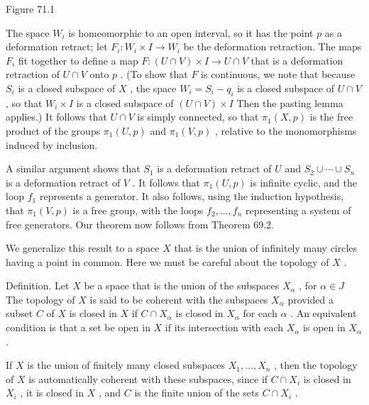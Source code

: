 \documentclass[10pt]{article}
\begin{document}
Figure 71.1

The space \({W}_{i}\) is homeomorphic to an open interval, so it has the point \(p\) as a deformation retract; let \({F}_{i} : {W}_{i} \times  I \rightarrow  {W}_{i}\) be the deformation retraction. The maps \({F}_{i}\) fit together to define a map \(F : \left( {U \cap  V}\right)  \times  I \rightarrow  U \cap  V\) that is a deformation retraction of \(U \cap  V\) onto \(p\) . (To show that \(F\) is continuous, we note that because \({S}_{i}\) is a closed subspace of \(X\) , the space \({W}_{i} = {S}_{i} - {q}_{i}\) is a closed subspace of \(U \cap  V\) , so that \({W}_{i} \times  I\) is a closed subspace of \(\left( {U \cap  V}\right)  \times  I\) Then the pasting lemma applies.) It follows that \(U \cap  V\) is simply connected, so that \({\pi }_{1}\left( {X,p}\right)\) is the free product of the groups \({\pi }_{1}\left( {U,p}\right)\) and \({\pi }_{1}\left( {V,p}\right)\) , relative to the monomorphisms induced by inclusion.

A similar argument shows that \({S}_{1}\) is a deformation retract of \(U\) and \({S}_{2} \cup  \cdots  \cup  {S}_{n}\) is a deformation retract of \(V\) . It follows that \({\pi }_{1}\left( {U,p}\right)\) is infinite cyclic, and the loop \({f}_{1}\) represents a generator. It also follows, using the induction hypothesis, that \({\pi }_{1}\left( {V,p}\right)\) is a free group, with the loops \({f}_{2},\ldots ,{f}_{n}\) representing a system of free generators. Our theorem now follows from Theorem 69.2.

We generalize this result to a space \(X\) that is the union of infinitely many circles having a point in common. Here we must be careful about the topology of \(X\) .

Definition. Let \(X\) be a space that is the union of the subspaces \({X}_{\alpha }\) , for \(\alpha  \in  J\) The topology of \(X\) is said to be coherent with the subspaces \({X}_{\alpha }\) provided a subset \(C\) of \(X\) is closed in \(X\) if \(C \cap  {X}_{\alpha }\) is closed in \({X}_{\alpha }\) for each \(\alpha\) . An equivalent condition is that a set be open in \(X\) if its intersection with each \({X}_{\alpha }\) is open in \({X}_{\alpha }\) .

If \(X\) is the union of finitely many closed subspaces \({X}_{1},\ldots ,{X}_{n}\) , then the topology of \(X\) is automatically coherent with these subspaces, since if \(C \cap  {X}_{i}\) is closed in \({X}_{i}\) , it is closed in \(X\) , and \(C\) is the finite union of the sets \(C \cap  {X}_{i}\) .
\end{document}
